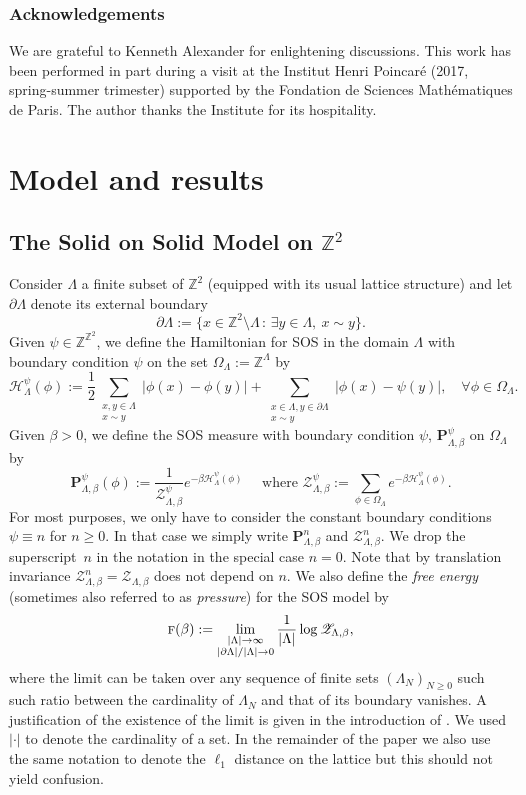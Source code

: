 \documentclass[10pt]{amsart}
\let\mathcal\mathscr
\newcommand{\sep}{\,:\,}
\numberwithin{equation}{section}
\theoremstyle{plain}
\theoremstyle{definition}
\newcommand{\cH}{{\ensuremath{\mathcal H}} }
\newcommand{\cZ}{{\ensuremath{\mathcal Z}} }
\newcommand{\bP}{{\ensuremath{\mathbf P}} }
\newcommand{\sumtwo}[2]{\sum_{\substack{#1 \\ #2}}}
\newcommand{\limtwo}[2]{\lim_{\substack{#1 \\ #2}}}
\newcommand{\bbZ}{{\ensuremath{\mathbb Z}} }
\newcommand{\gb}{\beta}
\newcommand{\gO}{\Omega}
\newcommand{\gL}{\Lambda}
\newcommand{\tf}{\textsc{f}}
\begin{document}
\subsubsection*{Acknowledgements}
We are grateful to Kenneth Alexander for enlightening discussions.
This work has been performed in part
during a visit at the Institut Henri Poincaré (2017, spring-summer trimester) supported by the Fondation de Sciences
Mathématiques de Paris. The author thanks the Institute for its hospitality.

\section{Model and results}

\subsection{The Solid on Solid Model on $\bbZ^2$}

Consider $\gL$ a finite subset of $\bbZ^2$ (equipped with its usual lattice structure) and let $\partial \gL$ denote its external boundary
\[
\partial \gL:= \{ x \in \bbZ^2 \setminus \gL \sep \exists y \in \gL, \ x \sim y \}.
\]
Given $\psi\in \bbZ^{\bbZ^2}$, we define the Hamiltonian for SOS in the domain $\gL$ with boundary condition $\psi$ on the set $\gO_{\gL}:= \bbZ^\gL$ by
\begin{equation}\label{defhamil}
\cH^{\psi}_\gL(\phi):= \frac{1}{2}\sumtwo{x, y \in \gL}{ x \sim y} |\phi(x)-\phi(y)|
+\sumtwo{x\in \gL, y\in \partial\gL}{x\sim y} |\phi(x)-\psi(y)|, \quad \forall \phi \in \gO_{\gL}.
\end{equation}
Given $\gb>0$, we define
the SOS measure with boundary condition $\psi$, $\bP^{\psi}_{\gL,\gb}$ on $\gO_{\gL}$ by
\begin{equation*}%
\bP^{\psi}_{\gL,\gb}(\phi):= \frac{1}{\mathcal Z^{\psi}_{\gL,\gb}}e^{-\gb\cH^{\psi}_\gL(\phi)} \quad \text{ where }
\mathcal Z^{\psi}_{\gL,\gb}:=\sum_{\phi\in \gO_{\gL}} e^{-\gb\cH^{\psi}_\gL(\phi)}.
\end{equation*}
For most purposes, we only have to consider the constant boundary conditions $\psi \equiv n$ for $n\ge 0$.
In that case we simply write $\bP^{n}_{\gL,\gb}$ and $\cZ^{n}_{\gL,\gb}$.
We drop the superscript~$n$ in the notation in the special case $n=0$.
Note that by translation invariance $\mathcal Z^n_{\gL,\gb}=\mathcal Z_{\gL,\gb}$ does not depend on $n$.
We also define the \textit{free energy} (sometimes also referred to as \textit{pressure}) for the SOS model by
\begin{equation*}
\tf(\gb):=\limtwo{|\gL|\to \infty}{|\partial\gL|/|\gL|\to 0} \frac{1}{|\gL|}\log \cZ_{\gL,\gb},
\end{equation*}
where the limit can be taken over any sequence of finite sets $(\gL_N)_{N\ge 0}$ such such ratio between the cardinality of
$\gL_N$ and that of its boundary vanishes. A justification of the existence of the limit is given in the introduction of \cite{cf:part1}.
We used $|\cdot|$ to denote the cardinality of a set. In the remainder of the paper we also use the same notation to denote the $\ell_1$ distance on the lattice but this should not yield confusion.
\end{document}
